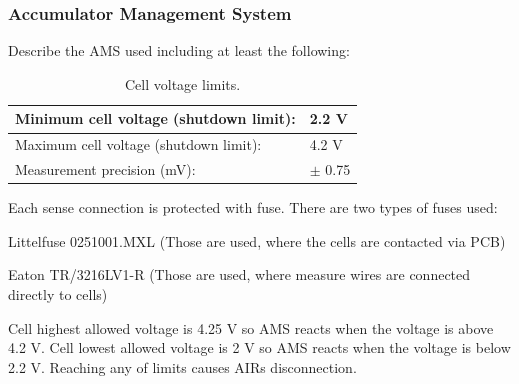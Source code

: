 \subsubsection{Accumulator Management System}
Describe the AMS used including at least the following:

\begin{table}[H]
	\centering
	\caption{Cell voltage limits.}
	\begin{tabularx}{\textwidth}{|X|X|}
		\hline
		Minimum cell voltage (shutdown limit): & 2.2 V \\[\TableSize]
		\hline
		Maximum cell voltage (shutdown limit): & 4.2 V \\[\TableSize]
		\hline
		Measurement precision (mV): & $\pm$ 0.75 \\[\TableSize]
		\hline
	\end{tabularx}%
	\label{tab:acc-limits}%
\end{table}%

Each sense connection is protected with fuse. There are two types of fuses used: 

\noindent Littelfuse 0251001.MXL (Those are used, where the cells are contacted via PCB)

\noindent Eaton TR/3216LV1-R (Those are used, where measure wires are connected directly to cells)

Cell highest allowed voltage is 4.25 V so AMS reacts when the voltage is above 4.2 V. Cell lowest allowed voltage is 2 V so AMS reacts when the voltage is below 2.2 V. Reaching any of limits causes AIRs disconnection.

